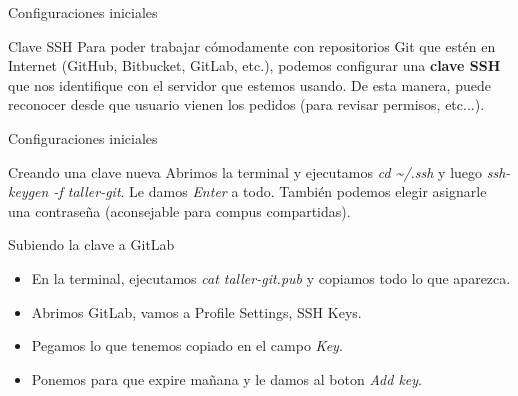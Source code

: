 \begin{frame}[fragile]{Configuraciones iniciales}

	\begin{block}{Clave SSH}
		Para poder trabajar cómodamente con repositorios Git que estén en Internet (GitHub, Bitbucket, GitLab, etc.), podemos configurar una \textbf{clave SSH} que nos identifique con el servidor que estemos usando. De esta manera, puede reconocer desde que usuario vienen los pedidos (para revisar permisos, etc...).

	\end{block}
\end{frame}
\begin{frame}{Configuraciones iniciales}
  \begin{block}{Creando una clave nueva}
		Abrimos la terminal y ejecutamos \textit{cd \textasciitilde/.ssh} y luego \textit{ssh-keygen -f taller-git}. Le damos \textit{Enter} a todo. También podemos elegir asignarle una contraseña (aconsejable para compus compartidas).
	\end{block}
  \pause
  \begin{block}{Subiendo la clave a GitLab}
		\begin{itemize}
		\item En la terminal, ejecutamos \textit{cat taller-git.pub} y copiamos todo lo que aparezca.
      \item Abrimos GitLab, vamos a Profile Settings, SSH Keys.
      \item Pegamos lo que tenemos copiado en el campo \textit{Key}.
      \item Ponemos para que expire mañana y le damos al boton \textit{Add key}.
		\end{itemize}
	\end{block}
\end{frame}

